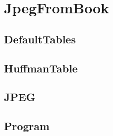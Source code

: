 \chapter{JpegFromBook}
\label{app:B}
\section*{DefaultTables}

\section*{HuffmanTable}

\section*{JPEG}

\section*{Program}


